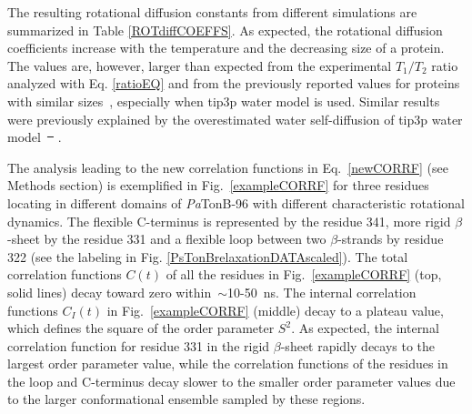 \documentclass[journal=jpcbfk,manuscript=article]{achemso}
\providecommand{\DIFadd}[1]{{\protect\color{blue}\uwave{#1}}} %
\providecommand{\DIFdel}[1]{{\protect\color{red}\sout{#1}}}                      %
\providecommand{\DIFaddbegin}{} %
\providecommand{\DIFaddend}{} %
\providecommand{\DIFdelbegin}{} %
\providecommand{\DIFdelend}{} %
\begin{document}
The resulting rotational diffusion constants from different simulations are
summarized in Table \ref{ROTdiffCOEFFS}.
As expected, the rotational diffusion coefficients
increase with the temperature and the decreasing size of a protein.
The values are, however, larger than 
expected from the experimental $T_1/T_2$ ratio analyzed with Eq. \ref{ratioEQ}
and from the previously reported values for proteins with similar
sizes~\cite{krishnan98}, especially when tip3p water model is used.
Similar results were previously explained by the overestimated water
self-diffusion of tip3p water model~\DIFdelbegin \DIFdel{\mbox{%
\cite{wong08}}%
}\DIFdelend \DIFaddbegin \DIFadd{\mbox{%
\cite{wong08,takemura12,debiec16}}%
}\DIFaddend .

The analysis leading to the new correlation functions in Eq.~\ref{newCORRF}
(see Methods section) is exemplified in
Fig.~\ref{exampleCORRF} for three residues locating in different domains of {\it Pa}TonB-96
with different characteristic rotational dynamics.
The flexible C-terminus is represented by the residue 341,
more rigid $\beta$-sheet by the residue 331 and a
flexible loop between two $\beta$-strands by residue 322
(see the labeling in Fig. \ref{PsTonBrelaxationDATAscaled}). 
The total correlation functions $C(t)$
of all the residues in Fig.~\ref{exampleCORRF}  (top, solid lines) 
decay toward zero within~$\sim$10-50~ns.
The internal correlation functions $C_I(t)$ in Fig.~\ref{exampleCORRF} (middle)
decay to a plateau value, which defines the square of the order parameter $S^2$.
As expected, the internal correlation function for residue 331 in the
rigid $\beta$-sheet rapidly decays to the largest order parameter value,
while the correlation functions of the residues in the loop and C-terminus 
decay slower to the smaller order parameter values due to the larger conformational ensemble
sampled by these regions.
\end{document}
